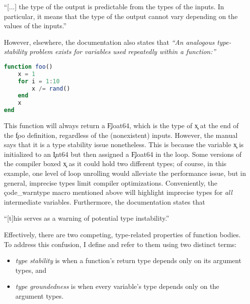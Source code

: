 \begin{itquote}
  ``[...] the type of the output is predictable from the types of the
  inputs. In particular, it means that the type of the output cannot vary
  depending on the values of the inputs.''
\end{itquote}
However, elsewhere, the documentation also states that \emph{``An analogous
type-stability problem exists for variables used repeatedly within a
function:''}
\begin{lstlisting}[basicstyle=\footnotesize\ttfamily,language=julia]
function foo()
    x = 1
    for i = 1:10
        x /= rand()
    end
    x
end
\end{lstlisting}
This function will always return a \c{Float64}, which is the type of \c{x}
at the end of the \c{foo} definition, regardless of the (nonexistent)
inputs. However, the manual says that it is a type stability issue nonetheless.
This is because the variable \c{x} is initialized to an \c{Int64} but then
assigned a \c{Float64} in the loop. Some versions of the compiler boxed \c{x} as
it could hold two different types; of course, in this example, one level of loop
unrolling would alleviate the performance issue, but in general,
imprecise types limit compiler optimizations.
Conveniently, the \c{code_warntype} macro mentioned above
will highlight imprecise types for \emph{all} intermediate variables.
Furthermore, the documentation states that
\begin{itquote}
  ``[t]his serves as a warning of potential type instability.''
\end{itquote}

Effectively, there are two competing, type-related properties
of function bodies. To address this confusion, I
define and refer to them using two distinct terms:
\begin{itemize}
  \item \emph{type stability} is when a function's return type depends only on
    its argument types, and
  \item \emph{type groundedness} is when every variable's type depends
    only on the argument types.
\end{itemize}

